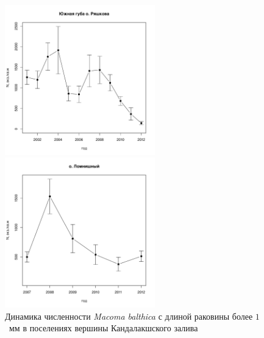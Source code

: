\documentclass[12pt, a4paper]{disser}
\begin{document}
\begin{figure}[h]
	\begin{minipage}[b]{.46\linewidth}
	\begin{center}
		\includegraphics[width=65mm]{../White_Sea/Ryashkov_YuG/N2_dynamic.pdf}
	\end{center}
	\end{minipage}
%
	\hfil %
%
	\begin{minipage}[b]{.46\linewidth}
	\begin{center}
		\includegraphics[width=65mm]{../White_Sea/Lomnishniy/N2_dynamic.pdf}
	\end{center}
	\end{minipage}



	\caption{Динамика численности {\it Macoma balthica} с длиной раковины более $1$~мм в поселениях вершины Кандалакшского залива}
	\label{ris:dynamic_Kandalaksha_all2}
	\end{figure}
\end{document}
